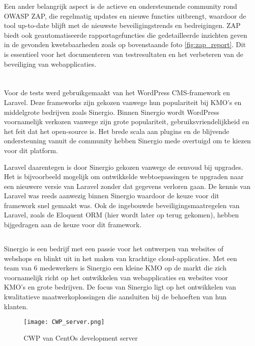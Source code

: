 Een ander belangrijk aspect is de actieve en ondersteunende community 
rond OWASP ZAP, die regelmatig updates en nieuwe functies uitbrengt, waardoor de tool up-to-date blijft met de nieuwste 
beveiligingstrends en bedreigingen. ZAP biedt ook geautomatiseerde rapportagefuncties die gedetailleerde inzichten geven 
in de gevonden kwetsbaarheden zoals op bovenstaande foto \ref{fig:zap_report}. Dit is essentieel voor het documenteren van testresultaten en het verbeteren van de beveiliging 
van webapplicaties. 

\section{}
Voor de tests werd gebruikgemaakt van het WordPress CMS-framework en Laravel. Deze frameworks zijn gekozen vanwege hun 
populariteit bij KMO's en middelgrote bedrijven zoals Sinergio. Binnen Sinergio wordt WordPress voornamelijk verkozen vanwege 
zijn grote populariteit, gebruiksvriendelijkheid en het feit dat het open-source is. Het brede scala aan plugins en de 
blijvende ondersteuning vanuit de community hebben Sinergio mede overtuigd om te kiezen voor dit platform. 


Laravel daarentegen is door Sinergio gekozen vanwege de eenvoud bij upgrades. Het is bijvoorbeeld mogelijk om ontwikkelde webtoepassingen 
te upgraden naar een nieuwere versie van Laravel zonder dat gegevens verloren gaan. De kennis van Laravel was 
reeds aanwezig binnen Sinergio waardoor de keuze voor dit framework snel gemaakt was. Ook de ingebouwde beveiligingsmaatregelen 
van Laravel, zoals de Eloquent ORM (hier wordt later op terug gekomen), hebben bijgedragen aan de keuze voor dit framework.

\subsection{}
Sinergio is een bedrijf met een passie voor het ontwerpen van websites of webshops en blinkt 
uit in het maken van krachtige cloud-applicaties. Met een team van 6 medewerkers is Sinergio een kleine KMO op de markt 
die zich voornamelijk richt op het ontwikkelen van webapplicaties en websites voor KMO's en grote bedrijven. De focus 
van Sinergio ligt op het ontwikkelen van kwalitatieve maatwerkoplossingen die aansluiten bij de behoeften van hun klanten.

\begin{figure}
    \centering
    \texttt{[image: CWP\_server.png]}
    \caption[CWP van CentOs development server]{CWP van CentOs development server}
    \label{fig:centos_server}
\end{figure}
